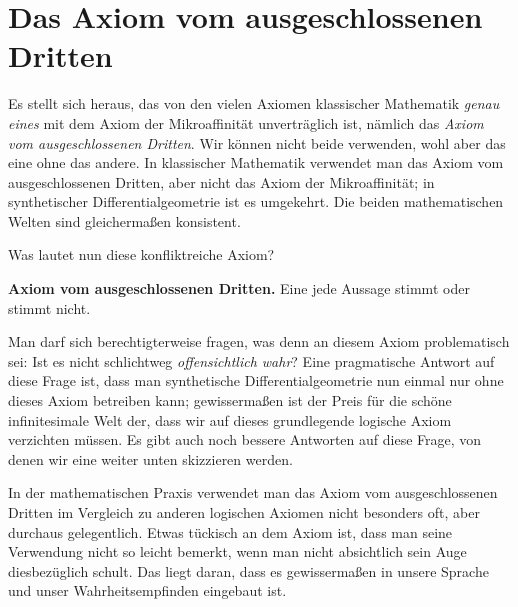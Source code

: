 \documentclass[twoside]{../zirkelblatt}
\theoremstyle{definition}
\theoremstyle{plain}
\theoremstyle{remark}
\begin{document}


\section{Das Axiom vom ausgeschlossenen Dritten}
\label{sect:lem}

Es stellt sich heraus, das von den vielen Axiomen klassischer Mathematik
\emph{genau eines} mit dem Axiom der Mikroaffinität unverträglich ist, nämlich
das \emph{Axiom vom ausgeschlossenen Dritten}. Wir können nicht beide
verwenden, wohl aber das eine ohne das andere. In klassischer Mathematik
verwendet man das Axiom vom ausgeschlossenen Dritten, aber nicht das Axiom der
Mikroaffinität; in synthetischer Differentialgeometrie ist es umgekehrt. Die
beiden mathematischen Welten sind gleichermaßen konsistent.

Was lautet nun diese konfliktreiche Axiom?

\begin{shaded}
\textbf{Axiom vom ausgeschlossenen Dritten.} Eine jede Aussage stimmt oder
stimmt nicht.
\end{shaded}

Man darf sich berechtigterweise fragen, was denn an diesem Axiom problematisch
sei: Ist es nicht schlichtweg \emph{offensichtlich wahr}? Eine pragmatische
Antwort auf diese Frage ist, dass man synthetische Differentialgeometrie nun einmal
nur ohne dieses Axiom betreiben kann; gewissermaßen ist der Preis für die
schöne infinitesimale Welt der, dass wir auf dieses grundlegende logische Axiom
verzichten müssen. Es gibt auch noch bessere Antworten auf diese Frage, von
denen wir eine weiter unten skizzieren werden.

In der mathematischen Praxis verwendet man das Axiom vom ausgeschlossenen
Dritten im Vergleich zu anderen logischen Axiomen nicht besonders oft, aber
durchaus gelegentlich. Etwas tückisch an dem Axiom ist, dass man seine
Verwendung nicht so leicht bemerkt, wenn man nicht absichtlich sein Auge
diesbezüglich schult. Das liegt daran, dass es gewissermaßen in unsere Sprache
und unser Wahrheitsempfinden eingebaut ist.
\end{document}
